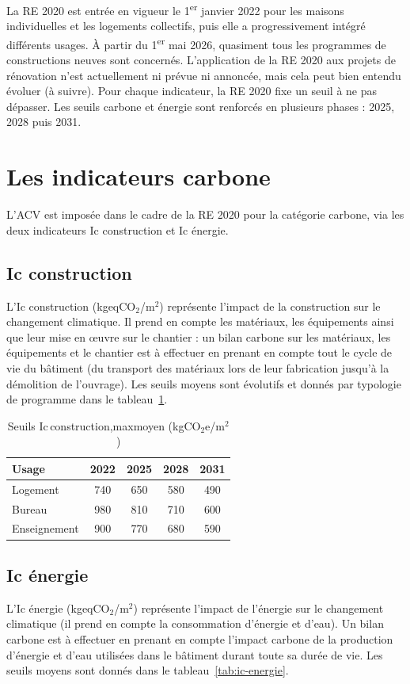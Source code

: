 La RE 2020 est entrée en vigueur le 1\textsuperscript{er} janvier 2022 pour les maisons individuelles et les logements collectifs, puis elle a progressivement intégré différents usages. À partir du 1\textsuperscript{er} mai 2026, quasiment tous les programmes de constructions neuves sont concernés. L'application de la RE 2020 aux projets de rénovation n'est actuellement ni prévue ni annoncée, mais cela peut bien entendu évoluer (à suivre).
Pour chaque indicateur, la RE 2020 fixe un seuil à ne pas dépasser. Les seuils carbone et énergie sont renforcés en plusieurs phases : 2025, 2028 puis 2031.

\section{Les indicateurs carbone}

L'ACV est imposée dans le cadre de la RE 2020 pour la catégorie carbone, via les deux indicateurs Ic construction et Ic énergie.

\subsection*{Ic construction}
L'Ic construction (kgeqCO$_2$/m$^2$) représente l'impact de la construction sur le changement climatique. Il prend en compte les matériaux, les équipements ainsi que leur mise en œuvre sur le chantier : un bilan carbone sur les matériaux, les équipements et le chantier est à effectuer en prenant en compte tout le cycle de vie du bâtiment (du transport des matériaux lors de leur fabrication jusqu'à la démolition de l'ouvrage). Les seuils moyens sont évolutifs et donnés par typologie de programme dans le tableau~\ref{tab:ic-construction}.

\begin{table}[h]
\centering
\caption{Seuils Ic\,construction,maxmoyen (kgCO$_2$e/m$^2$)}
\label{tab:ic-construction}
\begin{tabular}{lcccc}
\hline
Usage & 2022 & 2025 & 2028 & 2031 \\
\hline
Logement & 740 & 650 & 580 & 490 \\
Bureau & 980 & 810 & 710 & 600 \\
Enseignement & 900 & 770 & 680 & 590 \\
\hline
\end{tabular}
\end{table}

\subsection*{Ic énergie}
L'Ic énergie (kgeqCO$_2$/m$^2$) représente l'impact de l'énergie sur le changement climatique (il prend en compte la consommation d'énergie et d'eau). Un bilan carbone est à effectuer en prenant en compte l'impact carbone de la production d'énergie et d'eau utilisées dans le bâtiment durant toute sa durée de vie. Les seuils moyens sont donnés dans le tableau~\ref{tab:ic-energie}.

